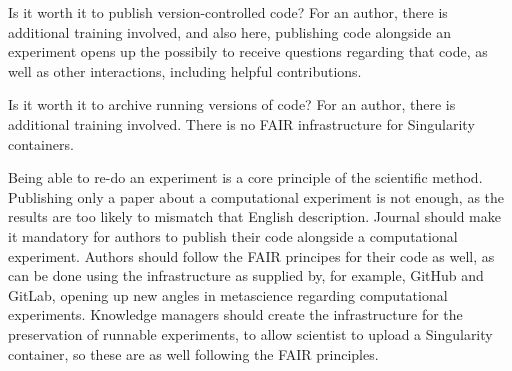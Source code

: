 
Is it worth it to publish version-controlled code?
For an author, 
there is additional training involved, and also here,
publishing code alongside an experiment opens up
the possibily to receive questions regarding that code,
as well as other interactions, including helpful contributions.


Is it worth it to archive running versions of code?
For an author, 
there is additional training involved.
There is no FAIR infrastructure for Singularity containers.



Being able to re-do an experiment is a core principle of the scientific method.
Publishing only a paper about a computational experiment is not enough,
as the results are too likely to mismatch that English description.
Journal should make it mandatory for authors
to publish their code alongside a computational experiment.
Authors should follow the FAIR principes for their code as well,
as can be done using the infrastructure as supplied by, 
for example, GitHub and GitLab, opening up new angles in
metascience regarding computational experiments.
Knowledge managers should create the infrastructure for the preservation
of runnable experiments, to allow scientist to upload a Singularity
container, so these are as well following the FAIR principles.

